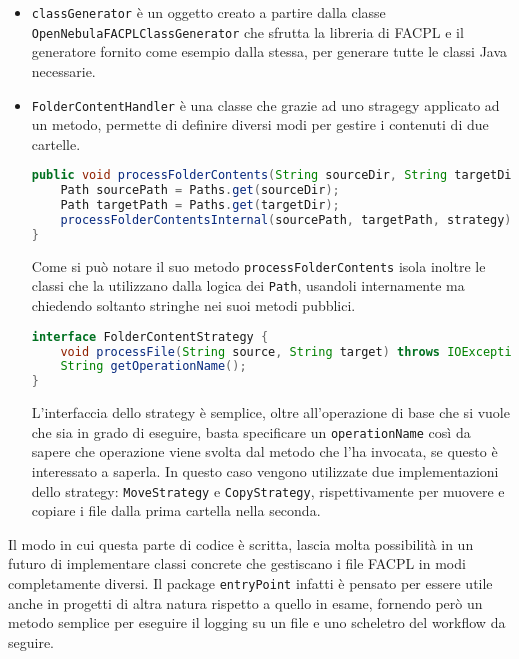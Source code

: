 \begin{itemize}
    \item \texttt{classGenerator} è un oggetto creato a partire dalla classe \texttt{OpenNebulaFACPLClassGenerator} che sfrutta la libreria di FACPL e il generatore fornito come esempio dalla stessa, per generare tutte le classi Java necessarie.
    \item \texttt{FolderContentHandler} è una classe che grazie ad uno stragegy\cite{GOF} applicato ad un metodo, permette di definire diversi modi per gestire i contenuti di due cartelle.
    \begin{lstlisting}[language=Java, xleftmargin=1em, caption=Metodo processFolderContent, label=code:processFolderContent, basicstyle=\fontsize{9.5}{10}\ttfamily]
public void processFolderContents(String sourceDir, String targetDir, FolderContentStrategy strategy) throws IOException {
    Path sourcePath = Paths.get(sourceDir);
    Path targetPath = Paths.get(targetDir);
    processFolderContentsInternal(sourcePath, targetPath, strategy);
}
            \end{lstlisting}
    Come si può notare il suo metodo \texttt{processFolderContents} isola inoltre le classi che la utilizzano dalla logica dei \texttt{Path}, usandoli internamente ma chiedendo soltanto stringhe nei suoi metodi pubblici.
    \begin{lstlisting}[language=Java, xleftmargin=1em, caption=Interfaccia FolderContentStrategy, label=code:FolderContentStrategy, basicstyle=\fontsize{9.5}{10}\ttfamily]
interface FolderContentStrategy {
    void processFile(String source, String target) throws IOException;
    String getOperationName();
}
    \end{lstlisting}
    L'interfaccia dello strategy è semplice, oltre all'operazione di base che si vuole che sia in grado di eseguire, basta specificare un \texttt{operationName} così da sapere che operazione viene svolta dal metodo che l'ha invocata, se questo è interessato a saperla.
    In questo caso vengono utilizzate due implementazioni dello strategy: \texttt{MoveStrategy} e \texttt{CopyStrategy}, rispettivamente per muovere e copiare i file dalla prima cartella nella seconda.
\end{itemize}
Il modo in cui questa parte di codice è scritta, lascia molta possibilità in un futuro di implementare classi concrete che gestiscano i file FACPL in modi completamente diversi. Il package \texttt{entryPoint} infatti è pensato per essere utile anche in progetti di altra natura rispetto a quello in esame, fornendo però un metodo semplice per eseguire il logging su un file e uno scheletro del workflow da seguire.

